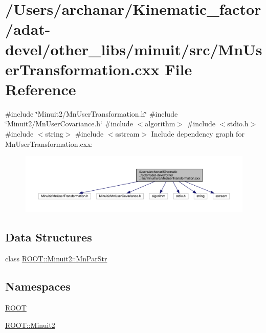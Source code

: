\hypertarget{adat-devel_2other__libs_2minuit_2src_2MnUserTransformation_8cxx}{}\section{/\+Users/archanar/\+Kinematic\+\_\+factor/adat-\/devel/other\+\_\+libs/minuit/src/\+Mn\+User\+Transformation.cxx File Reference}
\label{adat-devel_2other__libs_2minuit_2src_2MnUserTransformation_8cxx}
{\ttfamily \#include \char`\"{}Minuit2/\+Mn\+User\+Transformation.\+h\char`\"{}}\newline
{\ttfamily \#include \char`\"{}Minuit2/\+Mn\+User\+Covariance.\+h\char`\"{}}\newline
{\ttfamily \#include $<$algorithm$>$}\newline
{\ttfamily \#include $<$stdio.\+h$>$}\newline
{\ttfamily \#include $<$string$>$}\newline
{\ttfamily \#include $<$sstream$>$}\newline
Include dependency graph for Mn\+User\+Transformation.\+cxx\+:
\nopagebreak
\begin{figure}[H]
\begin{center}
\leavevmode
\includegraphics[width=350pt]{dc/daf/adat-devel_2other__libs_2minuit_2src_2MnUserTransformation_8cxx__incl}
\end{center}
\end{figure}
\subsection*{Data Structures}
\begin{DoxyCompactItemize}
\item 
class \mbox{\hyperlink{classROOT_1_1Minuit2_1_1MnParStr}{R\+O\+O\+T\+::\+Minuit2\+::\+Mn\+Par\+Str}}
\end{DoxyCompactItemize}
\subsection*{Namespaces}
\begin{DoxyCompactItemize}
\item 
 \mbox{\hyperlink{namespaceROOT}{R\+O\+OT}}
\item 
 \mbox{\hyperlink{namespaceROOT_1_1Minuit2}{R\+O\+O\+T\+::\+Minuit2}}
\end{DoxyCompactItemize}
